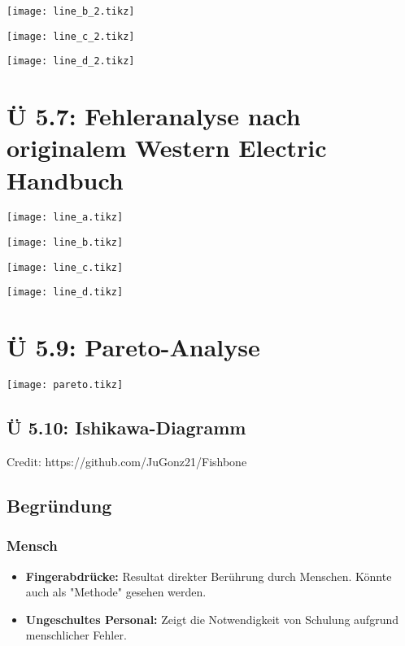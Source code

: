 \documentclass[12pt]{article}
\begin{document}
\texttt{[image: line\_b\_2.tikz]}

\texttt{[image: line\_c\_2.tikz]}

\texttt{[image: line\_d\_2.tikz]}

\section{Ü 5.7: Fehleranalyse nach originalem Western Electric Handbuch}

\texttt{[image: line\_a.tikz]}

\texttt{[image: line\_b.tikz]}

\texttt{[image: line\_c.tikz]}

\texttt{[image: line\_d.tikz]}



\section{Ü 5.9: Pareto-Analyse}

\texttt{[image: pareto.tikz]}

\begin{landscape}
	\section{Ü 5.10: Ishikawa-Diagramm}

	Credit: https://github.com/JuGonz21/Fishbone

	\begin{center}
		\resizebox{\linewidth}{!}{%
			
		}
	\end{center}
\end{landscape}

\subsection{Begründung}

\subsubsection*{Mensch}
\begin{itemize}
	\item \textbf{Fingerabdrücke:} Resultat direkter Berührung durch Menschen. Könnte auch als "Methode" gesehen werden.
	\item \textbf{Ungeschultes Personal:} Zeigt die Notwendigkeit von Schulung aufgrund menschlicher Fehler.
\end{itemize}
\end{document}
